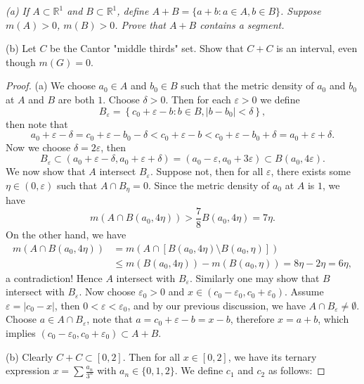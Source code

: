 \begin{problem}\em
(a) If $A\subset\mathbb{R}^1$ and $B\subset\mathbb{R}^1$, define $A+B=\{a+b:a\in A,b\in B\}$. Suppose $m(A)>0$, $m(B)>0$. Prove that $A+B$ contains a segment.\par
(b) Let $C$ be the Cantor "middle thirds" set. Show that $C+C$ is an interval, even though $m(G)=0$.
\end{problem}
\begin{proof}
(a) We choose $a_0\in A$ and $b_0\in B$ such that the metric density of $a_0$ and $b_0$ at $A$ and $B$ are both $1$. Choose $\delta>0$. Then for each $\varepsilon>0$ we define 
$$
B_{\varepsilon}=\left\{ c_0+\varepsilon -b:b\in B,\left| b-b_0 \right|<\delta \right\} ,
$$
then note that 
$$
a_0+\varepsilon -\delta =c_0+\varepsilon -b_0-\delta <c_0+\varepsilon -b<c_0+\varepsilon -b_0+\delta =a_0+\varepsilon +\delta .
$$
Now we choose $\delta=2\varepsilon$, then 
$$
B_{\varepsilon}\subset \left( a_0+\varepsilon -\delta ,a_0+\varepsilon +\delta \right) =\left( a_0-\varepsilon ,a_0+3\varepsilon \right) \subset B\left( a_0,4\varepsilon \right) .
$$
We now show that $A$ intersect $B_\varepsilon$. Suppose not, then for all $\varepsilon$, there exists some $\eta\in (0,\varepsilon)$ such that $A\cap B_\eta=0$. Since the metric density of $a_0$ at $A$ is $1$, we have 
$$
m\left( A\cap B\left( a_0,4\eta \right) \right) >\frac{7}{8}B\left( a_0,4\eta \right) =7\eta .
$$
On the other hand, we have 
$$
\begin{aligned}
m\left( A\cap B\left( a_0,4\eta \right) \right) &=m\left( A\cap \left[ B\left( a_0,4\eta \right) \setminus B\left( a_0,\eta \right) \right] \right) 
\\
&\le m\left( B\left( a_0,4\eta \right) \right) -m\left( B\left( a_0,\eta \right) \right) =8\eta -2\eta =6\eta ,
\end{aligned}
$$
a contradiction! Hence $A$ intersect with $B_\varepsilon$. Similarly one may show that $B$ intersect with $B_\varepsilon$. Now choose $\varepsilon_0>0$ and $x\in (c_0-\varepsilon_0,c_0+\varepsilon_0)$. Assume $\varepsilon=|c_0-x|$, then $0<\varepsilon<\varepsilon_0$, and by our previous discussion, we have $A\cap B_\varepsilon\ne\emptyset$. Choose $a\in A\cap B_\varepsilon$, note that $a=c_0+\varepsilon-b=x-b$, therefore $x=a+b$, which implies $(c_0-\varepsilon_0,c_0+\varepsilon_0)\subset A+B$.\par
(b) Clearly $C+C\subset[0,2]$. Then for all $x\in [0,2]$, we have its ternary expression $x=\sum\frac{a_n}{3^n}$ with $a_n\in\{0,1,2\}$. We define $c_1$ and $c_2$ as follows: 

\end{proof}
